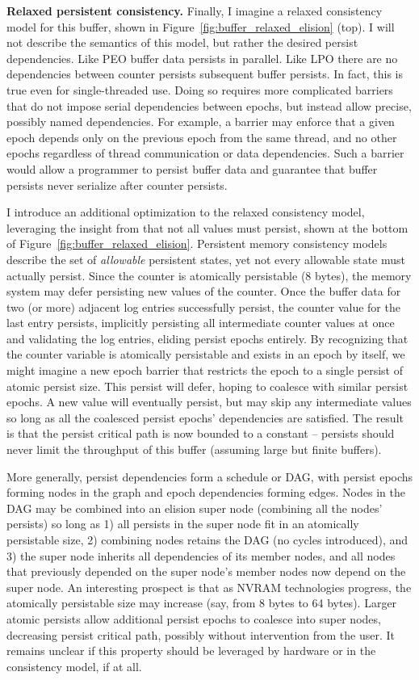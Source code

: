 \textbf{Relaxed persistent consistency.}
Finally, I imagine a relaxed consistency model for this buffer, shown in Figure~\ref{fig:buffer_relaxed_elision} (top).
I will not describe the semantics of this model, but rather the desired persist dependencies.
Like PEO buffer data persists in parallel.
Like LPO there are no dependencies between counter persists subsequent buffer persists.
In fact, this is true even for single-threaded use.
Doing so requires more complicated barriers that do not impose serial dependencies between epochs, but instead allow precise, possibly named dependencies.
For example, a barrier may enforce that a given epoch depends only on the previous epoch from the same thread, and no other epochs regardless of thread communication or data dependencies.
Such a barrier would allow a programmer to persist buffer data and guarantee that buffer persists never serialize after counter persists.

I introduce an additional optimization to the relaxed consistency model, leveraging the insight from \cite{FangHsiao11} that not all values must persist, shown at the bottom of Figure~\ref{fig:buffer_relaxed_elision}.
Persistent memory consistency models describe the set of \emph{allowable} persistent states, yet not every allowable state must actually persist.
Since the counter is atomically persistable (8 bytes), the memory system may defer persisting new values of the counter.
Once the buffer data for two (or more) adjacent log entries successfully persist, the counter value for the last entry persists, implicitly persisting all intermediate counter values at once and validating the log entries, eliding persist epochs entirely.
By recognizing that the counter variable is atomically persistable and exists in an epoch by itself, we might imagine a new epoch barrier that restricts the epoch to a single persist of atomic persist size.
This persist will defer, hoping to coalesce with similar persist epochs.
A new value will eventually persist, but may skip any intermediate values so long as all the coalesced persist epochs' dependencies are satisfied.
The result is that the persist critical path is now bounded to a constant -- persists should never limit the throughput of this buffer (assuming large but finite buffers).

More generally, persist dependencies form a schedule or DAG, with persist epochs forming nodes in the graph and epoch dependencies forming edges.
Nodes in the DAG may be combined into an elision super node (combining all the nodes' persists) so long as 1) all persists in the super node fit in an atomically persistable size, 2) combining nodes retains the DAG (no cycles introduced), and 3) the super node inherits all dependencies of its member nodes, and all nodes that previously depended on the super node's member nodes now depend on the super node.
An interesting prospect is that as NVRAM technologies progress, the atomically persistable size may increase (say, from 8 bytes to 64 bytes).
Larger atomic persists allow additional persist epochs to coalesce into super nodes, decreasing persist critical path, possibly without intervention from the user.
It remains unclear if this property should be leveraged by hardware or in the consistency model, if at all.

